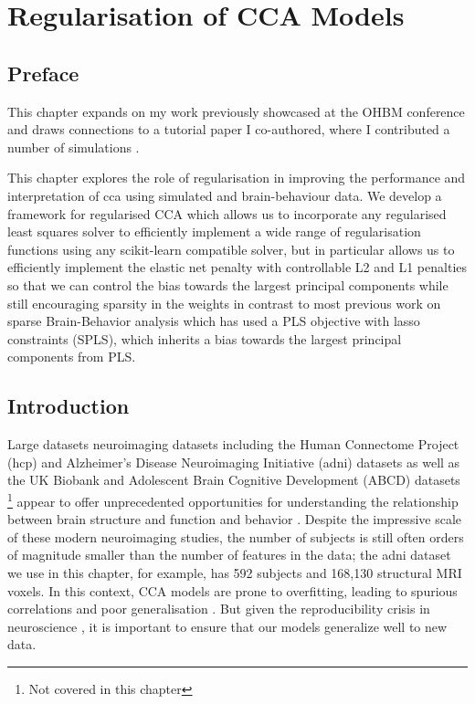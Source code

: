\graphicspath{{chapters/regularisation}}


\chapter{Regularisation of CCA Models}\label{chap:als}
\minitoc
\section*{Preface}

This chapter expands on my work previously showcased at the OHBM conference and draws connections to a tutorial paper I co-authored, where I contributed a number of simulations \citep{mihalik2022canonical}.

This chapter explores the role of regularisation in improving the performance and interpretation of \acrshort{cca} using simulated and brain-behaviour data.
We develop a framework for regularised CCA which allows us to incorporate any regularised least squares solver to efficiently implement a wide range of regularisation functions using any scikit-learn compatible solver, but in particular allows us to efficiently implement the elastic net penalty with controllable L2 and L1 penalties so that we can control the bias towards the largest principal components while still encouraging sparsity in the weights in contrast to most previous work on sparse Brain-Behavior analysis which has used a PLS objective with lasso constraints (SPLS), which inherits a bias towards the largest principal components from PLS.


\section{Introduction}\label{sec:introduction}

Large datasets neuroimaging datasets including the Human Connectome Project (\acrshort{hcp}) and Alzheimer's Disease Neuroimaging Initiative (\acrshort{adni}) datasets as well as the UK Biobank and Adolescent Brain Cognitive Development (ABCD) datasets \footnote{Not covered in this chapter} appear to offer unprecedented opportunities for understanding the relationship between brain structure and function and behavior \citep{SMITH2018263,BZDOK2017549,wang2020finding}.
Despite the impressive scale of these modern neuroimaging studies, the number of subjects is still often orders of magnitude smaller than the number of features in the data; the \acrshort{adni} dataset we use in this chapter, for example, has 592 subjects and 168,130 structural MRI voxels.
In this context, CCA models are prone to overfitting, leading to spurious correlations and poor generalisation \citep{helmer2020stability,mihalik2020multiple}.
But given the reproducibility crisis in neuroscience \citep{button2013power}, it is important to ensure that our models generalize well to new data.

